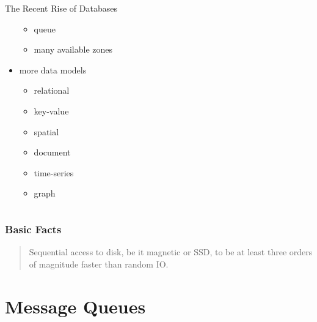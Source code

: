 \documentclass[lualatex]{beamer}
\begin{document}
\begin{frame}
\begin{columns}
\begin{column}{0.45\textwidth}
\begin{exampleblock}{The Recent Rise of Databases}
\begin{itemize}
\begin{itemize}
              \item queue
              \item many available zones
            \end{itemize}
          \item more data models
            \begin{itemize}
              \item relational
              \item key-value
              \item spatial
              \item document
              \item time-series
              \item graph
            \end{itemize}
        \end{itemize}
      \end{exampleblock}
    \end{column}
  \end{columns}
\end{frame}

\begin{frame}
  \frametitle{Basic Facts}
  \begin{quotation}
    Sequential access to disk, be it magnetic or SSD, to be at least three orders of magnitude faster than random IO.
  \end{quotation}
\end{frame}

\section{Message Queues}
\frame{\tableofcontents[currentsection]}
\end{document}

